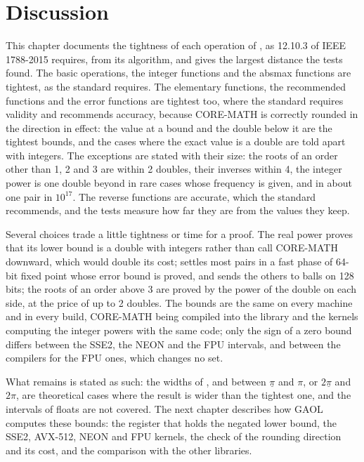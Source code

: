 \documentclass[12pt,a4paper,twoside,openright]{book}
\begin{document}
\section{Discussion}

This chapter documents the tightness of each operation of ,
as 12.10.3 of IEEE 1788-2015 requires, from its algorithm, and gives the
largest distance the tests found. The basic operations, the integer
functions and the absmax functions are tightest, as the standard requires.
The elementary functions, the recommended functions and the error
functions are tightest too, where the standard requires validity and
recommends accuracy, because CORE-MATH is correctly rounded in the
direction in effect: the value at a bound and the double below it are the
tightest bounds, and the cases where the exact value is a double are told
apart with integers. The exceptions are stated with their size: the roots
of an order other than 1, 2 and 3 are within 2 doubles, their inverses
within 4, the integer power is one double beyond in rare cases whose
frequency is given, and  in about one pair in $10^{17}$.
The reverse functions are accurate, which the standard recommends, and the
tests measure how far they are from the values they keep.

\medskip
Several choices trade a little tightness or time for a proof. The real
power proves that its lower bound is a double with integers rather than
call CORE-MATH downward, which would double its cost; 
settles most pairs in a fast phase of 64-bit fixed point whose error bound
is proved, and sends the others to balls on 128 bits; the roots of an
order above 3 are proved by the power of the double on each side, at the
price of up to 2 doubles. The bounds are the same on every machine and in
every build, CORE-MATH being compiled into the library and the kernels
computing the integer powers with the same code; only the sign of a zero
bound differs between the SSE2, the NEON and the FPU intervals, and
between the compilers for the FPU ones, which changes no set.

\medskip
What remains is stated as such: the widths of ,  and
 between $\underline{\pi}$ and $\pi$, or $2\underline{\pi}$ and
$2\pi$, are theoretical cases where the result is wider than the tightest
one, and the intervals of floats are not covered. The next chapter
describes how GAOL computes these bounds: the register that holds the
negated lower bound, the SSE2, AVX-512, NEON and FPU kernels, the check of
the rounding direction and its cost, and the comparison with the other
libraries.
\end{document}
